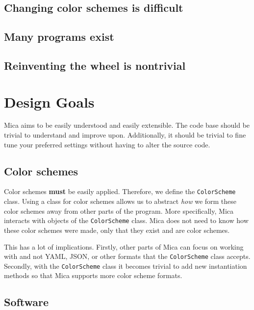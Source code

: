 \documentclass{article}
\theoremstyle{definition}
\begin{document}
    \subsection{Changing color schemes is difficult}

    \subsection{Many programs exist}

    \subsection{Reinventing the wheel is nontrivial}

    \newpage


    \section{Design Goals}

    Mica aims to be easily understood and easily extensible. The code base should be trivial to understand and improve upon. Additionally, it should be trivial to fine tune your preferred settings without having to alter the source code.

    \subsection{Color schemes}

    Color schemes \textbf{must} be easily applied. Therefore, we define the \texttt{ColorScheme} class. Using a class for color schemes allows us to abstract \emph{how} we form these color schemes away from other parts of the program. More specifically, Mica interacts with objects of the \texttt{ColorScheme} class. Mica does not need to know how these color schemes were made, only that they exist and are color schemes.

    This has a lot of implications. Firstly, other parts of Mica can focus on working with  and not YAML, JSON, or other formats that the \texttt{ColorScheme} class accepts. Secondly, with the \texttt{ColorScheme} class it becomes trivial to add new instantiation methods so that Mica supports more color scheme formats.

    \subsection{Software}
\end{document}
